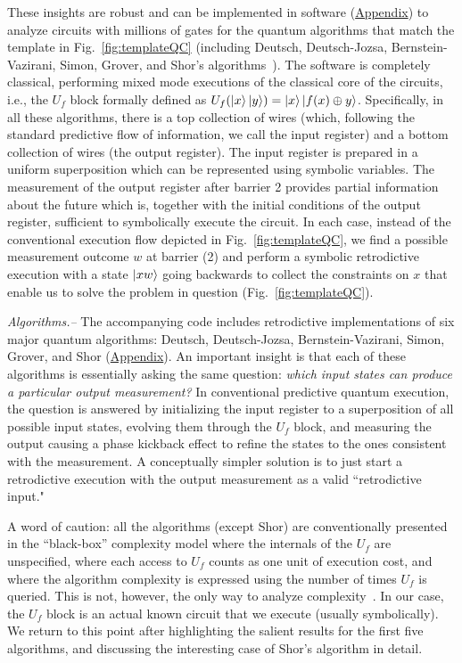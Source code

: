 \documentclass[aps,prl,twocolumn,superscriptaddress,floatfix,notitlepage]{revtex4-2}
\begin{document}
These insights are robust and can be implemented in software
(\hyperref[sec:Methods]{Appendix}) to analyze circuits with millions
of gates for the quantum algorithms that match the template in
Fig.~\ref{fig:templateQC} (including Deutsch, Deutsch-Jozsa,
Bernstein-Vazirani, Simon, Grover, and Shor's
algorithms~\cite{doi:10.1137/S0097539796300921,deutsch,deutschJozsa,365701,doi:10.1137/S0097539795293172,mermin_2007,nielsen_chuang_2010,10.1145/237814.237866}). The
software is completely classical, performing mixed mode executions of
the classical core of the circuits, i.e., the $U_f$ block formally
defined as $U_f(\ket{x}\ket{y}) = \ket{x}\ket{f(x) \oplus
  y}$. Specifically, in all these algorithms, there is a top
collection of wires (which, following the standard predictive flow of
information, we call the input register) and a bottom collection of
wires (the output register). The input register is prepared in a
uniform superposition which can be represented using symbolic
variables. The measurement of the output register after barrier 2
provides partial information about the future which is, together with
the initial conditions of the output register, sufficient to
symbolically execute the circuit. In each case, instead of the
conventional execution flow depicted in Fig.~\ref{fig:templateQC}, we
find a possible measurement outcome $w$ at barrier (2) and perform a
symbolic retrodictive execution with a state $\ket{xw}$ going
backwards to collect the constraints on $x$ that enable us to solve
the problem in question (Fig.~\ref{fig:templateQC}).

{\it Algorithms.--} 
The accompanying code includes retrodictive implementations of six
major quantum algorithms: Deutsch, Deutsch-Jozsa, Bernstein-Vazirani,
Simon, Grover, and Shor \cite{mermin_2007,nielsen_chuang_2010} 
(\hyperref[sec:Methods]{Appendix}). 
An important insight is that each of these algorithms is essentially asking
the same question: \emph{which input states can produce a particular output
measurement?} In conventional predictive quantum execution, the 
question is answered by initializing the input register to a superposition of all
possible input states, evolving them through the $U_f$ block, and measuring
the output causing a phase kickback effect to refine the states to the ones
consistent with the measurement. A conceptually simpler solution is to just
start a retrodictive execution with the output measurement as a valid ``retrodictive 
input."

A word of
caution: all the algorithms (except Shor) are conventionally 
presented in the ``black-box'' complexity model where the internals of the $U_f$ 
are unspecified, where each access to $U_f$ counts
as one unit of execution cost, and where the algorithm complexity is expressed
using the number of times $U_f$ is queried. This is not, however, the only way to
analyze complexity~\cite{10.1145/3341106}. In our case, the $U_f$ block is an actual 
known circuit that we execute (usually symbolically). We return to this point
after highlighting the salient results for the
first five algorithms, and discussing the interesting case of
Shor's algorithm in detail.
\end{document}
